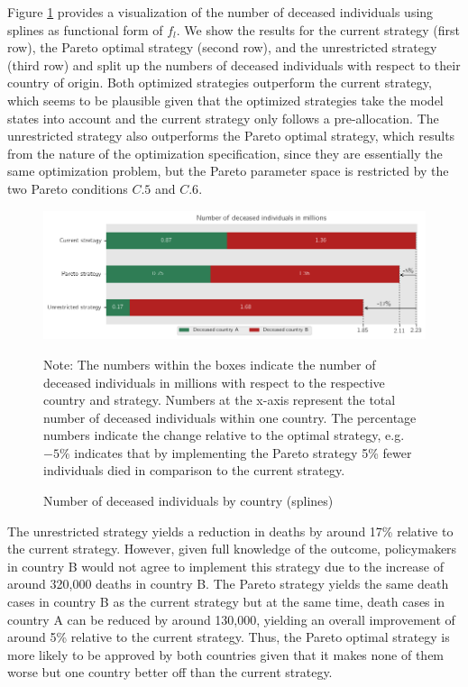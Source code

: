Figure \ref{fig:results_splines_numbers} provides a visualization of the number of deceased individuals using splines as functional form of $f_l$. We show the results for the current strategy (first row), the Pareto optimal strategy (second row), and the unrestricted strategy (third row) and split up the numbers of deceased individuals with respect to their country of origin. Both optimized strategies outperform the current strategy, which seems to be plausible given that the optimized strategies take the model states into account and the current strategy only follows a pre-allocation. The unrestricted strategy also outperforms the Pareto optimal strategy, which results from the nature of the optimization specification, since they are essentially the same optimization problem, but the Pareto parameter space is restricted by the two Pareto conditions $C.5$ and $C.6$. 
\begin{figure}[h!]
\centering
\includegraphics[scale=0.75]{images/splines_percentage_deviation.png}
\begin{flushleft}
\scriptsize{Note: The numbers within the boxes indicate the number of deceased individuals in millions with respect to the respective country and strategy. Numbers at the x-axis represent the total number of deceased individuals within one country. The percentage numbers indicate the change relative to the optimal strategy, e.g. $-5\%$ indicates that by implementing the Pareto strategy 5\% fewer individuals died in comparison to the current strategy.}
\end{flushleft}
\caption{Number of deceased individuals by country (splines)}
\label{fig:results_splines_numbers}
\end{figure}

The unrestricted strategy yields a reduction in deaths by around 17\% relative to the current strategy. However, given full knowledge of the outcome, policymakers in country B would not agree to implement this strategy due to the increase of around 320,000 deaths in country B. The Pareto strategy yields the same death cases in country B as the current strategy but at the same time, death cases in country A can be reduced by around 130,000, yielding an overall improvement of around 5\% relative to the current strategy. Thus, the Pareto optimal strategy is more likely to be approved by both countries given that it makes none of them worse but one country better off than the current strategy. \\


